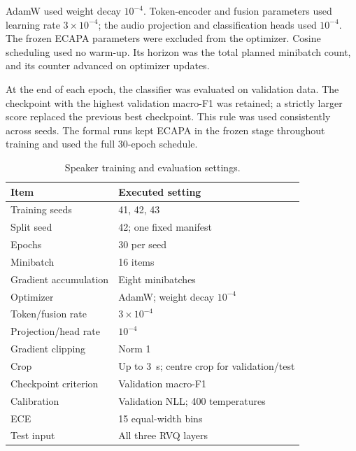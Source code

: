 AdamW used weight decay $10^{-4}$. Token-encoder and fusion parameters used learning rate $3\times10^{-4}$; the audio projection and classification heads used $10^{-4}$. The frozen ECAPA parameters were excluded from the optimizer. Cosine scheduling used no warm-up. Its horizon was the total planned minibatch count, and its counter advanced on optimizer updates.

At the end of each epoch, the classifier was evaluated on validation data. The checkpoint with the highest validation macro-F1 was retained; a strictly larger score replaced the previous best checkpoint. This rule was used consistently across seeds. The formal runs kept ECAPA in the frozen stage throughout training and used the full 30-epoch schedule.

\begin{table}[t]
\centering
\caption{Speaker training and evaluation settings.}
\label{tab:sv2-speaker-settings}
\small
\begin{tabularx}{\columnwidth}{@{}lY@{}}
\toprule
Item & Executed setting\\
\midrule
Training seeds & 41, 42, 43\\
Split seed & 42; one fixed manifest\\
Epochs & 30 per seed\\
Minibatch & 16 items\\
Gradient accumulation & Eight minibatches\\
Optimizer & AdamW; weight decay $10^{-4}$\\
Token/fusion rate & $3\times10^{-4}$\\
Projection/head rate & $10^{-4}$\\
Gradient clipping & Norm 1\\
Crop & Up to 3~s; centre crop for validation/test\\
Checkpoint criterion & Validation macro-F1\\
Calibration & Validation NLL; 400 temperatures\\
ECE & 15 equal-width bins\\
Test input & All three RVQ layers\\
\bottomrule
\end{tabularx}
\end{table}

